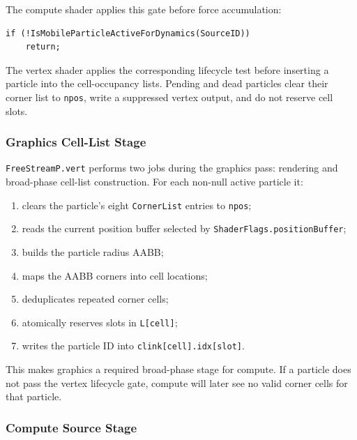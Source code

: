 The compute shader applies this gate before force accumulation:
\begin{verbatim}
if (!IsMobileParticleActiveForDynamics(SourceID))
    return;
\end{verbatim}

The vertex shader applies the corresponding lifecycle test before inserting a
particle into the cell-occupancy lists.  Pending and dead particles clear
their corner list to \texttt{npos}, write a suppressed vertex output, and do
not reserve cell slots.

\subsubsection{Graphics Cell-List Stage}

\texttt{FreeStreamP.vert} performs two jobs during the graphics pass:
rendering and broad-phase cell-list construction.  For each non-null active
particle it:
\begin{enumerate}
    \item clears the particle's eight \texttt{CornerList} entries to
          \texttt{npos};
    \item reads the current position buffer selected by
          \texttt{ShaderFlags.positionBuffer};
    \item builds the particle radius AABB;
    \item maps the AABB corners into cell locations;
    \item deduplicates repeated corner cells;
    \item atomically reserves slots in \texttt{L[cell]};
    \item writes the particle ID into \texttt{clink[cell].idx[slot]}.
\end{enumerate}

This makes graphics a required broad-phase stage for compute.  If a particle
does not pass the vertex lifecycle gate, compute will later see no valid
corner cells for that particle.

\subsubsection{Compute Source Stage}

